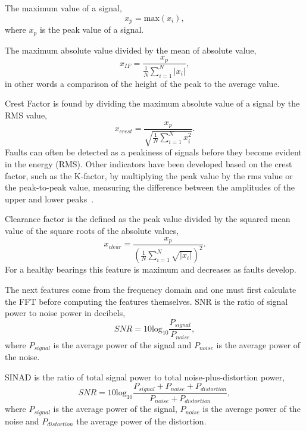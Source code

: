 \documentclass[]{article}
\begin{document}
The maximum value of a signal,
\begin{equation}
x_p = \textrm{max}(x_i),
\end{equation}
where $x_p$ is the peak value of a signal.

The maximum absolute value divided by the mean of absolute value,
\begin{equation}
x_{IF} = \frac{x_p}{\frac{1}{N}\sum^N_{i=1}|x_i|},
\end{equation}
in other words a comparison of the height of the peak to the average value.

Crest Factor is found by dividing the maximum absolute value of a signal by the \gls{RMS} value,
\begin{equation}
x_{crest} = \frac{x_p}{\sqrt{\frac{1}{N}\sum^N_{i=1}x^2_i}}.
\end{equation}
Faults can often be detected as a peakiness of signals before they become evident in the energy (\gls{RMS}). Other indicators have been developed based on the crest factor, such as the K-factor, by multiplying the peak value by the rms value or the peak-to-peak value, measuring the difference between the amplitudes of the upper and lower peaks~\cite{soualhi2021novel}.

Clearance factor is the defined as the peak value divided by the squared mean value of the square roots of the absolute values,
\begin{equation}
x_{clear} = \frac{x_p}{(\frac{1}{N}\sum^N_{i=1}\sqrt{|x_i|})^2}.
\end{equation}
For a healthy bearings this feature is maximum and decreases as faults develop.

The next features come from the frequency domain and one must first calculate the \gls{FFT} before computing the features themselves.
\gls{SNR} is the ratio of signal power to noise power in decibels,
\begin{equation}
	SNR = 10 \textrm{log}_{10} \frac{P_{signal}}{P_{noise}},
\end{equation}
where $P_{signal}$ is the average power of the signal and $P_{noise}$ is the average power of the noise.

\gls{SINAD} is the ratio of total signal power to total noise-plus-distortion power,
\begin{equation}
	SNR = 10 \textrm{log}_{10} \frac{P_{signal} + P_{noise} + P_{distortion}}{P_{noise} + P_{distortion}}, 
\end{equation}
where $P_{signal}$ is the average power of the signal, $P_{noise}$ is the average power of the noise and $P_{distortion}$ the average power of the distortion.
\end{document}
